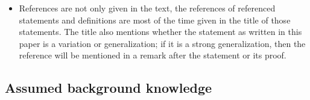 \documentclass[a4paper,oneside,11pt,bibliography=totoc]{scrartcl}
\def\ba#1\ea{\begin{align}#1\end{align}}
\theoremstyle{plain}
\theoremstyle{remark}
\newtheorem{remark}[theorem]{Remarks}
\theoremstyle{definition}
\begin{document}
\begin{itemize}
\begin{definitions}{Graded extension of products, \newline \cite[generalization of Definition 5.5.3; page 275]{Hamilton}}{GradingOfProducts}
$\stackrel{\wedge}{,}$ may be written just as a comma when a zero-form is involved.
%
\end{definitions}

In case of antisymmetric tensors we of course get:

\begin{propositions}{Graded extensions of antisymmetric tensors}{GradedExtensionPlusAntiSymm}
Let $E_1, E_2 \to N$ be real vector bundles of finite rank over a smooth manifold $N$, $F \in \Omega^2(E_1; E_2)$. Then
\ba
F \mleft( A \stackrel{\wedge}{,} B \mright)
&=
-\mleft( -1 \mright)^{km}
F \mleft( B \stackrel{\wedge}{,} A \mright)
\ea 
for all $A \in \Omega^k(N; E_1)$ and $B \in \Omega^m(N; E_1)$ ($k,m \in \mathbb{N}_0$). Similarly extended to all $F \in \Omega^l(E_1; E_2)$.
\end{propositions}

\begin{remark}
\leavevmode\newline
This is a generalization of similar relations just using the Lie algebra bracket $\mleft[ \cdot, \cdot\mright]_{\mathfrak{g}}$ of a Lie algebra $\mathfrak{g}$, see \cite[\S 5, first statement of Exercise 5.15.14; page 316]{Hamilton}.
\end{remark}

\begin{proof}
\leavevmode\newline
Trivial, for example by using local coordinates.
\end{proof}

\item References are not only given in the text, the references of referenced statements and
definitions are most of the time given in the title of those statements. The title also mentions
whether the statement as written in this paper is a variation or generalization; if it is a
strong generalization, then the reference will be mentioned in a remark after the statement
or its proof.

\end{itemize}

\subsection{Assumed background knowledge}
\end{document}

